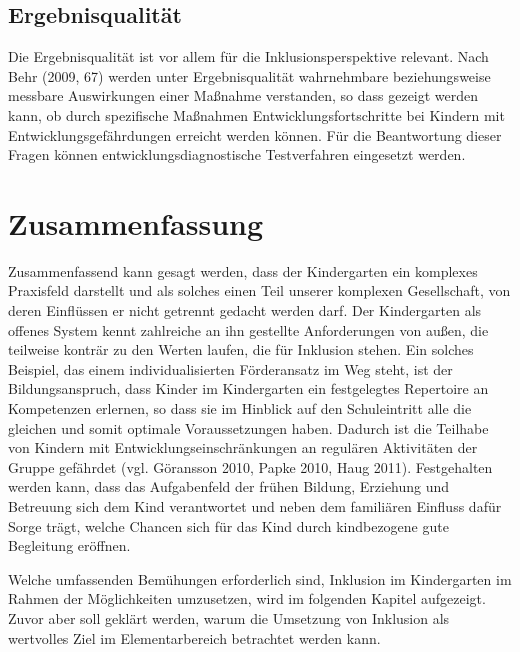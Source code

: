 \subsection{Ergebnisqualität}
Die Ergebnisqualität ist vor allem für die Inklusionsperspektive relevant. Nach Behr (2009, 67) werden unter Ergebnisqualität  wahrnehmbare beziehungsweise messbare Auswirkungen einer Maßnahme verstanden, so dass gezeigt werden kann, ob durch spezifische Maßnahmen Entwicklungsfortschritte bei Kindern mit Entwicklungsgefährdungen erreicht werden können. Für die Beantwortung dieser Fragen können entwicklungsdiagnostische Testverfahren eingesetzt werden.


\section{Zusammenfassung}

Zusammenfassend kann gesagt werden, dass der Kindergarten ein komplexes Praxisfeld darstellt und als solches einen Teil unserer komplexen Gesellschaft, von deren Einflüssen er nicht getrennt gedacht werden darf. Der Kindergarten als offenes System kennt zahlreiche an ihn gestellte Anforderungen von außen, die teilweise konträr zu den Werten laufen, die für Inklusion stehen. 
Ein solches Beispiel, das einem individualisierten Förderansatz im Weg steht, ist der Bildungsanspruch, dass Kinder im Kindergarten ein festgelegtes Repertoire an Kompetenzen erlernen, so dass sie im Hinblick auf den Schuleintritt alle die gleichen und somit optimale Voraussetzungen haben. Dadurch ist die Teilhabe von Kindern mit Entwicklungseinschränkungen an regulären Aktivitäten der Gruppe gefährdet (vgl. Göransson 2010, Papke 2010, Haug 2011). Festgehalten werden kann, dass das Aufgabenfeld der frühen Bildung, Erziehung und Betreuung sich dem Kind verantwortet und neben dem familiären Einfluss dafür Sorge trägt, welche Chancen sich für das Kind durch kindbezogene gute Begleitung eröffnen.

Welche umfassenden Bemühungen erforderlich sind, Inklusion im Kindergarten im Rahmen der Möglichkeiten umzusetzen, wird im folgenden Kapitel aufgezeigt. Zuvor aber soll geklärt werden, warum die Umsetzung von Inklusion als wertvolles Ziel im Elementarbereich betrachtet werden kann.
